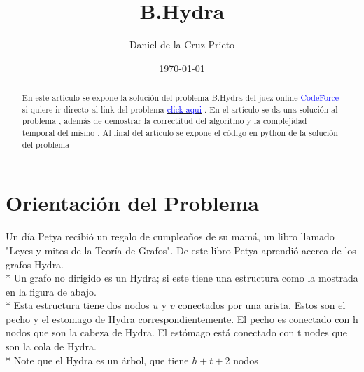 \documentclass[12pt]{article}
\begin{document}
    \title{B.Hydra} 
    \author{Daniel de la Cruz Prieto} 
    \date{\today} 
    \maketitle

    \begin{abstract}
        \noindent En este art\'iculo se expone la soluci\'on del problema B.Hydra del juez online \href{https://codeforces.com/} { \textcolor{blue}{CodeForce} }  
        si quiere ir directo al link del problema \href{https://codeforces.com/problemset/problem/243/B}{\textcolor{blue}{click aqui}} . En el art\'iculo se da una soluci\'on al problema , adem\'as de 
        demostrar la correctitud del algoritmo y la complejidad temporal del mismo . Al final del articulo se expone el c\'odigo en python de la soluci\'on del problema   
    \end{abstract}

    
    \section*{Orientaci\'on del Problema }
    \begin{flushleft}
        Un d\'ia Petya recibi\'o un regalo de cumplea\~nos de su mam\'a, un libro llamado "Leyes y mitos de la Teor\'ia de Grafos". De este libro Petya aprendi\'o acerca de los grafos Hydra.
        \\*
        Un grafo no dirigido es un Hydra; si este tiene una estructura como la mostrada en la figura de abajo.
        \\*
        Esta estructura tiene dos nodos $u$ y $v$ conectados por una arista. Estos son el pecho y el estomago de Hydra
        correspondientemente. El pecho es conectado con h nodos que son la cabeza de Hydra. El est\'omago est\'a conectado con t nodes que son la cola de Hydra.
        \\*
        Note que el Hydra es un \'arbol, que tiene $h+t+2$ nodos
    \end{flushleft}
    
\end{document}
